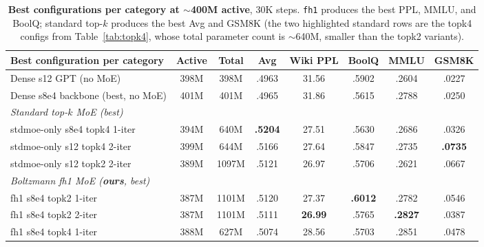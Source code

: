 \documentclass[oneside]{article}
\begin{document}
\begin{table}[t]
\centering
\caption{\textbf{Best configurations per category at $\sim$400M active}, 30K steps. \texttt{fh1} produces the best PPL, MMLU, and BoolQ; standard top-$k$ produces the best Avg and GSM8K (the two highlighted standard rows are the topk4 configs from Table~\ref{tab:topk4}, whose total parameter count is $\sim$640M, smaller than the topk2 variants).}
\label{tab:summary}
\begin{adjustbox}{max width=\textwidth}
\begin{tabular}{l|cc|c|c|c|c|c}
\toprule
\textbf{Best configuration per category} & \textbf{Active} & \textbf{Total} & \textbf{Avg} & \textbf{Wiki PPL} & \textbf{BoolQ} & \textbf{MMLU} & \textbf{GSM8K} \\
\midrule
Dense s12 GPT (no MoE)                                & 398M & 398M  & .4963 & 31.56 & .5902 & .2604 & .0227 \\
Dense s8e4 backbone (best, no MoE)                    & 401M & 401M  & .4965 & 31.86 & .5615 & .2788 & .0250 \\
\midrule
\textit{Standard top-$k$ MoE (best)}                  &      &       &       &       &       &       &       \\
\quad stdmoe-only s8e4 topk4 1-iter                   & 394M & 640M  & \textbf{.5204} & 27.51 & .5630 & .2686 & .0326 \\
\quad stdmoe-only s12  topk4 2-iter                   & 399M & 644M  & .5166 & 27.64 & .5847 & .2735 & \textbf{.0735} \\
\quad stdmoe-only s12  topk2 2-iter                   & 389M & 1097M & .5121 & 26.97 & .5706 & .2621 & .0667 \\
\midrule
\textit{Boltzmann fh1 MoE (\textbf{ours}, best)}      &      &       &       &       &       &       &       \\
\quad fh1 s8e4 topk2 1-iter                           & 387M & 1101M & .5120 & 27.37 & \textbf{.6012} & .2782 & .0546 \\
\quad fh1 s8e4 topk2 2-iter                           & 387M & 1101M & .5111 & \textbf{26.99} & .5765 & \textbf{.2827} & .0387 \\
\quad fh1 s8e4 topk4 1-iter                           & 388M & 627M  & .5074 & 28.56 & .5703 & .2851 & .0478 \\
\bottomrule
\end{tabular}
\end{adjustbox}
\end{table}
\end{document}
